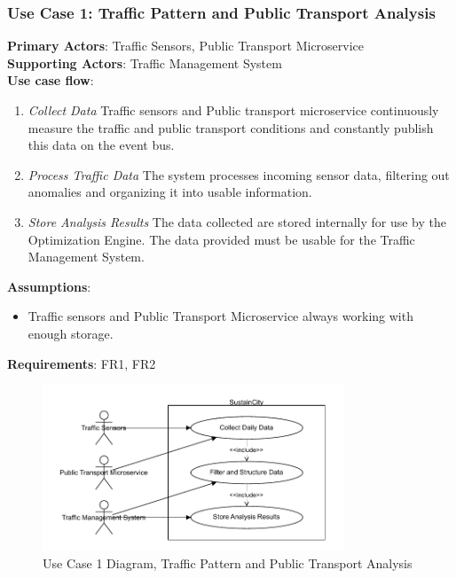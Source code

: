 \documentclass[a4paper,12pt]{article}
\begin{document}
\subsubsection*{Use Case 1: Traffic Pattern and Public Transport Analysis}
\textbf{Primary Actors}: Traffic Sensors, Public Transport Microservice \\
\textbf{Supporting Actors}: Traffic Management System \\ 
\textbf{Use case flow}: 
\begin{enumerate}
    \item \textit{Collect Data} Traffic sensors and Public transport microservice continuously measure the traffic and public transport conditions and constantly publish this data on the event bus.
    \item \textit{Process Traffic Data} The system processes incoming sensor data, filtering out anomalies and organizing it into usable information.
    \item \textit{Store Analysis Results} The data collected are stored internally for use by the Optimization Engine. The data provided must be usable for the Traffic Management System.
\end{enumerate}
\textbf{Assumptions}: 
\begin{itemize}
    \item Traffic sensors and Public Transport Microservice always working with enough storage.
\end{itemize}
\textbf{Requirements}: FR1, FR2
\\
\begin{figure}[h]
    \centering
    \includegraphics[width=0.8\textwidth]{diagrams/Traffic_Pattern_and_Public_Transport_Analysis.drawio.pdf}
    \caption{Use Case 1 Diagram, Traffic Pattern and Public Transport Analysis}
    \label{fig:Traffic_Pattern_and_Public_Transport_Analysis.drawio}
\end{figure}
\\
\end{document}
